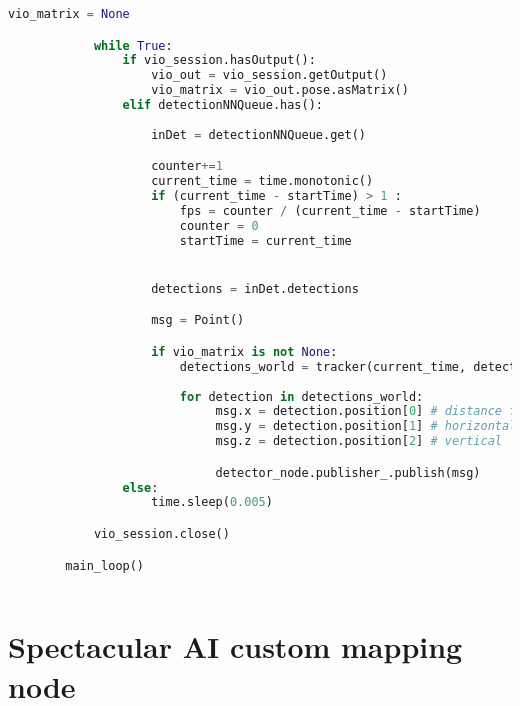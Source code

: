 \begin{lstlisting}[language=python,frame=single]
            vio_matrix = None

            while True:
                if vio_session.hasOutput():
                    vio_out = vio_session.getOutput()
                    vio_matrix = vio_out.pose.asMatrix()
                elif detectionNNQueue.has():
                    
                    inDet = detectionNNQueue.get()

                    counter+=1
                    current_time = time.monotonic()
                    if (current_time - startTime) > 1 :
                        fps = counter / (current_time - startTime)
                        counter = 0
                        startTime = current_time


                    detections = inDet.detections

                    msg = Point()

                    if vio_matrix is not None:
                        detections_world = tracker(current_time, detections, vio_matrix)
                        
                        for detection in detections_world:
                             msg.x = detection.position[0] # distance from camera
                             msg.y = detection.position[1] # horizontal
                             msg.z = detection.position[2] # vertical

                             detector_node.publisher_.publish(msg)                        
                else:
                    time.sleep(0.005)

            vio_session.close()

        main_loop()
        
\end{lstlisting}

\section{Spectacular AI custom mapping node} \label{spectacularai_node_code}


